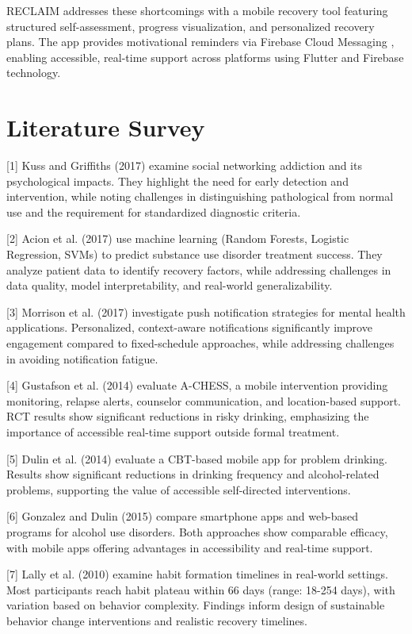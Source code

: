 \documentclass[a4paper]{article}
\begin{document}
RECLAIM addresses these shortcomings with a mobile recovery tool featuring structured self-assessment, progress visualization, and personalized recovery plans. The app provides motivational reminders via Firebase Cloud Messaging \cite{b3}, enabling accessible, real-time support across platforms using Flutter and Firebase technology.
\section{Literature Survey}\label{sec:literature}
[1] Kuss and Griffiths (2017) examine social networking addiction and its psychological impacts. They highlight the need for early detection and intervention, while noting challenges in distinguishing pathological from normal use and the requirement for standardized diagnostic criteria.

[2] Acion et al. (2017) use machine learning (Random Forests, Logistic Regression, SVMs) to predict substance use disorder treatment success. They analyze patient data to identify recovery factors, while addressing challenges in data quality, model interpretability, and real-world generalizability.

[3] Morrison et al. (2017) investigate push notification strategies for mental health applications. Personalized, context-aware notifications significantly improve engagement compared to fixed-schedule approaches, while addressing challenges in avoiding notification fatigue.

[4] Gustafson et al. (2014) evaluate A-CHESS, a mobile intervention providing monitoring, relapse alerts, counselor communication, and location-based support. RCT results show significant reductions in risky drinking, emphasizing the importance of accessible real-time support outside formal treatment.

[5] Dulin et al. (2014) evaluate a CBT-based mobile app for problem drinking. Results show significant reductions in drinking frequency and alcohol-related problems, supporting the value of accessible self-directed interventions.

[6] Gonzalez and Dulin (2015) compare smartphone apps and web-based programs for alcohol use disorders. Both approaches show comparable efficacy, with mobile apps offering advantages in accessibility and real-time support.

[7] Lally et al. (2010) examine habit formation timelines in real-world settings. Most participants reach habit plateau within 66 days (range: 18-254 days), with variation based on behavior complexity. Findings inform design of sustainable behavior change interventions and realistic recovery timelines.
\end{document}
